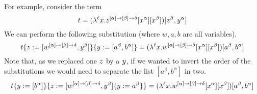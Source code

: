 \begin{example} For example, consider the term
\[
  t =
    (\lambda^{\ell} x. z^{[\alpha] \to [\beta] \to \delta} [x^\alpha] [x^\beta])
      [z^\beta,y^\alpha]
\]
We can perform the following substitution (where $w,a,b$ are all variables).
\[
  \subs{
    \subs{\tm}{\varthree}{[w^{[\alpha] \to [\beta] \to \delta}, \vartwo^\beta]}
  }{
    \vartwo
  }{
    [a^\beta,b^\alpha]
  }
  =
   (\lamp{\lab}{\var}{w^{[\alpha] \to [\beta] \to \delta} [\var^\alpha] [\var^\beta]})
    [a^\beta,b^\alpha]
\]
Note that, as we replaced one $z$ by a $y$, if we wanted to invert the order
of the substitutions we would need to separate the list $[a^\beta, b^\alpha]$ in two.
\[
  \subs{
    \subs{\tm}{\vartwo}{[b^\alpha]}
  }{
    \varthree
  }{
    \subs{[w^{[\alpha] \to [\beta] \to \delta}, \vartwo^\beta]}{\vartwo}{a^\beta}
  }
  =
   (\lamp{\lab}{\var}{w^{[\alpha] \to [\beta] \to \delta} [\var^\alpha] [\var^\beta]})
    [a^\beta,b^\alpha]
\]
\end{example}




